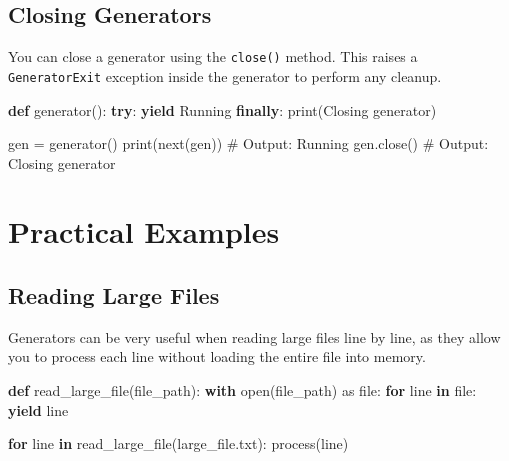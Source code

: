 \documentclass[
  letterpaper,
  DIV=11,
  numbers=noendperiod]{scrreprt}
\newenvironment{Shaded}{\begin{snugshade}}{\end{snugshade}}
\newcommand{\BuiltInTok}[1]{\textcolor[rgb]{0.00,0.23,0.31}{#1}}
\newcommand{\CommentTok}[1]{\textcolor[rgb]{0.37,0.37,0.37}{#1}}
\newcommand{\ControlFlowTok}[1]{\textcolor[rgb]{0.00,0.23,0.31}{\textbf{#1}}}
\newcommand{\ImportTok}[1]{\textcolor[rgb]{0.00,0.46,0.62}{#1}}
\newcommand{\KeywordTok}[1]{\textcolor[rgb]{0.00,0.23,0.31}{\textbf{#1}}}
\newcommand{\NormalTok}[1]{\textcolor[rgb]{0.00,0.23,0.31}{#1}}
\newcommand{\OperatorTok}[1]{\textcolor[rgb]{0.37,0.37,0.37}{#1}}
\newcommand{\StringTok}[1]{\textcolor[rgb]{0.13,0.47,0.30}{#1}}
\begin{document}
\subsection{Closing Generators}\label{closing-generators}

You can close a generator using the \texttt{close()} method. This raises
a \texttt{GeneratorExit} exception inside the generator to perform any
cleanup.

\begin{Shaded}
\begin{Highlighting}[]
\KeywordTok{def}\NormalTok{ generator():}
    \ControlFlowTok{try}\NormalTok{:}
        \ControlFlowTok{yield} \StringTok{\textquotesingle{}Running\textquotesingle{}}
    \ControlFlowTok{finally}\NormalTok{:}
        \BuiltInTok{print}\NormalTok{(}\StringTok{\textquotesingle{}Closing generator\textquotesingle{}}\NormalTok{)}

\NormalTok{gen }\OperatorTok{=}\NormalTok{ generator()}
\BuiltInTok{print}\NormalTok{(}\BuiltInTok{next}\NormalTok{(gen))  }\CommentTok{\# Output: Running}
\NormalTok{gen.close()  }\CommentTok{\# Output: Closing generator}
\end{Highlighting}
\end{Shaded}

\section{Practical Examples}\label{practical-examples-5}

\subsection{Reading Large Files}\label{reading-large-files}

Generators can be very useful when reading large files line by line, as
they allow you to process each line without loading the entire file into
memory.

\begin{Shaded}
\begin{Highlighting}[]
\KeywordTok{def}\NormalTok{ read\_large\_file(file\_path):}
    \ControlFlowTok{with} \BuiltInTok{open}\NormalTok{(file\_path) }\ImportTok{as} \BuiltInTok{file}\NormalTok{:}
        \ControlFlowTok{for}\NormalTok{ line }\KeywordTok{in} \BuiltInTok{file}\NormalTok{:}
            \ControlFlowTok{yield}\NormalTok{ line}

\ControlFlowTok{for}\NormalTok{ line }\KeywordTok{in}\NormalTok{ read\_large\_file(}\StringTok{\textquotesingle{}large\_file.txt\textquotesingle{}}\NormalTok{):}
\NormalTok{    process(line)}
\end{Highlighting}
\end{Shaded}
\end{document}

